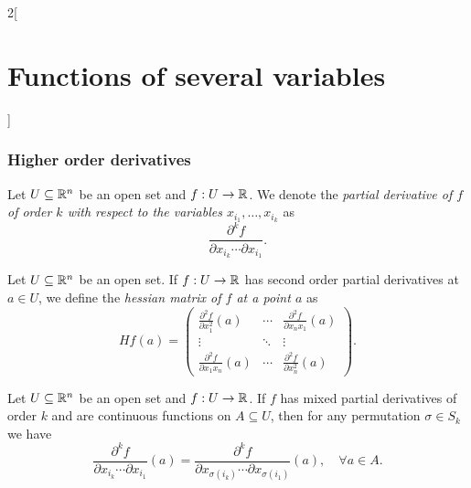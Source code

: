 \documentclass[../../../main.tex]{subfiles}
\begin{document}
\begin{multicols}{2}[\section{Functions of several variables}]
    \subsubsection*{Higher order derivatives}
    \begin{definition}
        Let $U\subseteq\mathbb{R}^n$ be an open set and $f:U\rightarrow\mathbb{R} $. We denote the \textit{partial derivative of $f$ of order $k$ with respect to the variables $x_{i_1},\ldots,x_{i_k}$} as $$\frac{\partial^kf}{\partial x_{i_k}\cdots\partial x_{i_1}}.$$
    \end{definition}
    \begin{definition}
        Let $U\subseteq\mathbb{R}^n$ be an open set. If $f:U\rightarrow\mathbb{R} $ has second order partial derivatives at $a\in U$, we define the \textit{hessian matrix of $f$ at a point $a$} as $$Hf(a)=\begin{pmatrix}
                \displaystyle \frac{\partial^2 f}{\partial x_1^2}(a)  & \cdots & \displaystyle \frac{\partial^2 f}{\partial x_nx_1}(a) \\
                \vdots                                                & \ddots & \vdots                                                \\
                \displaystyle \frac{\partial^2 f}{\partial x_1x_n}(a) & \cdots & \displaystyle \frac{\partial^2 f}{\partial x_n^2}(a)
            \end{pmatrix}.$$
    \end{definition}
    \begin{theorem}
        Let $U\subseteq\mathbb{R}^n$ be an open set and $f:U\rightarrow\mathbb{R} $. If $f$ has mixed partial derivatives of order $k$ and are continuous functions on $A\subseteq U$, then for any permutation $\sigma\in S_k$ we have $$\frac{\partial^kf}{\partial x_{i_k}\cdots\partial x_{i_1}}(a)=\frac{\partial^kf}{\partial x_{\sigma(i_k)}\cdots\partial x_{\sigma(i_1)}}(a),\quad\forall a\in A.$$
    \end{theorem}

\end{multicols}
\end{document}
